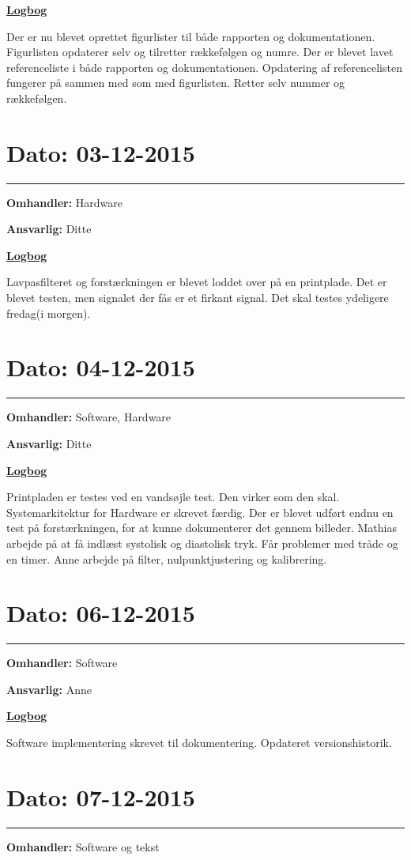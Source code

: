 \underline{\textbf{Logbog}}

Der er nu blevet oprettet figurlister til både rapporten og dokumentationen. Figurlisten opdaterer selv og tilretter rækkefølgen og numre. Der er blevet lavet referenceliste i både rapporten og dokumentationen. Opdatering af referencelisten fungerer på sammen med som med figurlisten. Retter selv nummer og rækkefølgen.  
\\

\section{Dato: 03-12-2015}
\hrule
\textbf{Omhandler:} Hardware

\textbf{Ansvarlig:} Ditte  

\underline{\textbf{Logbog}}

Lavpasfilteret og forstærkningen er blevet loddet over på en printplade. Det er blevet testen, men signalet der fås er et firkant signal. Det skal testes ydeligere fredag(i morgen).  
\\

\section{Dato: 04-12-2015}
\hrule
\textbf{Omhandler:} Software, Hardware

\textbf{Ansvarlig:} Ditte  

\underline{\textbf{Logbog}}

Printpladen er testes ved en vandsøjle test. Den virker som den skal. Systemarkitektur for Hardware er skrevet færdig. Der er blevet udført endnu en test på forstærkningen, for at kunne dokumenterer det gennem billeder.
Mathias arbejde på at få indlæst systolisk og diastolisk tryk. Får problemer med tråde og en timer. Anne arbejde på filter, nulpunktjustering og kalibrering.    
\newpage
\section{Dato: 06-12-2015}
\hrule
\textbf{Omhandler:} Software

\textbf{Ansvarlig:} Anne 

\underline{\textbf{Logbog}}

Software implementering skrevet til dokumentering. Opdateret versionshistorik.   
\\

\section{Dato: 07-12-2015}
\hrule
\textbf{Omhandler:} Software og tekst

